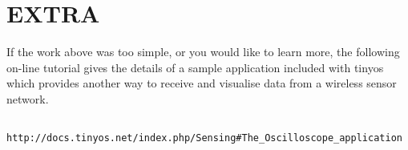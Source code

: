 \documentclass [a4] {article}
\begin{document}
\section{EXTRA}

If the work above was too simple, or you would like to learn more, the following on-line tutorial gives the details of a sample application included with tinyos which provides another way to receive and visualise data from a wireless sensor network.


\begin{verbatim}

http://docs.tinyos.net/index.php/Sensing#The_Oscilloscope_application

\end{verbatim}

\end{document}
